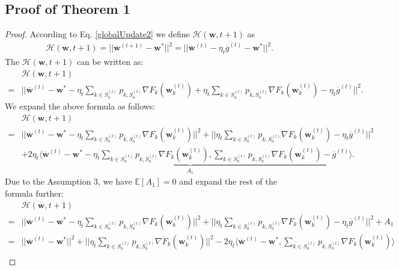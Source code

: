 \documentclass[10pt,journal,compsoc]{IEEEtran}
\newtheorem{proof}{Proof}[section]
\newcommand{\w}{\mathbf{w}}
\newcommand{\s}{S_a^{(t)}}
\begin{document}
\subsection{Proof of Theorem 1}
\begin{proof}
According to Eq. \eqref{globalUpdate2} we define $\mathcal{H}(\w,t+1)$ as
\begin{equation}
\begin{split}
&\mathcal{H}(\w,t+1) = ||\overline{\w}^{(t+1)}-\w^*||^2 = ||\overline{\w}^{(t)} - \eta_t\overline{g}^{(t)} - \w^*||^2.
\end{split}
\end{equation}
The $\mathcal{H}(\w,t+1)$ can be written as:
\begin{equation}
\begin{split}
&\mathcal{H}(\w,t+1) \\
=& ||\overline{\w}^{(t)} - \w^* - \eta_t\sum_{k \in \s}p_{k,\s}\nabla F_k(\w_k^{(t)}) + \eta_t\sum_{k \in \s}p_{k,\s}\nabla F_k(\w_k^{(t)}) -\eta_t \overline{g}^{(t)}||^2.
\end{split}
\end{equation}
We expand the above formula as follows:
\begin{equation}
\begin{split}
&\mathcal{H}(\w,t+1) \\
=& ||\overline{\w}^{(t)} - \w^* -\eta_t\sum_{k \in \s}p_{k,\s}\nabla F_k(\w_k^{(t)})||^2+ ||\eta_t\sum_{k \in \s}p_{k,\s}\nabla F_k(\w_k^{(t)}) - \eta_t\overline{g}^{(t)}||^2 \\
&+ \underbrace{2\eta_t\langle\overline{\w}^{(t)} - \w^* -\eta_t\sum_{k \in \s}p_{k,\s}\nabla F_k(\w_k^{(t)}),\sum_{k \in \s}p_{k,\s}\nabla F_k(\w_k^{(t)}) - \overline{g}^{(t)}\rangle}_{A_1}.
\end{split}
\end{equation}
Due to the Assumption 3, we have $\mathbb{E}[A_1]=0$ and expand the rest of the formula further:
\begin{equation}
\begin{split}
&\mathcal{H}(\w,t+1) \\
=& ||\overline{\w}^{(t)} - \w^* -\eta_t\sum_{k \in \s}p_{k,\s}\nabla F_k(\w_k^{(t)})||^2+ ||\eta_t\sum_{k \in \s}p_{k,\s}\nabla F_k(\w_k^{(t)}) - \eta_t\overline{g}^{(t)}||^2 +A_1\\
=& ||\overline{\w}^{(t)} - \w^*||^2 + ||\eta_t\sum_{k \in \s}p_{k,\s}\nabla F_k(\w_k^{(t)})||^2 - 2\eta_t\langle\overline{\w}^{(t)}-\w^*,\sum_{k \in S_a^{(t)}}p_{k,\s}\nabla F_k(\w_k^{(t)})\rangle \\

\end{split}
\end{equation}
\end{proof}
\end{document}
